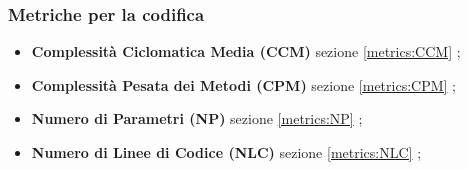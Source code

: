\subsubsection{Metriche per la codifica}
\begin{itemize}
	\item \textbf{Complessità Ciclomatica Media (CCM)} sezione \ref{metrics:CCM} ;
	\item \textbf{Complessità Pesata dei Metodi (CPM)} sezione	\ref{metrics:CPM} ;
	\item \textbf{Numero di Parametri (NP)} sezione	\ref{metrics:NP} ;
	\item \textbf{Numero di Linee di Codice (NLC)} sezione	\ref{metrics:NLC} ;
\end{itemize}
%		
